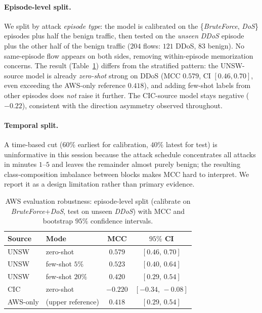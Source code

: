 \documentclass[preprint,12pt,authoryear]{elsarticle}
\begin{document}
\paragraph{Episode-level split.} We split by attack \emph{episode type}: the model
is calibrated on the \{\emph{BruteForce}, \emph{DoS}\} episodes plus half the benign
traffic, then tested on the \emph{unseen} \emph{DDoS} episode plus the other half of
the benign traffic ($204$ flows: $121$ DDoS, $83$ benign). No same-episode flow
appears on both sides, removing within-episode memorization concerns. The result
(Table~\ref{tab:rt-robust}) differs from the stratified pattern: the UNSW-source
model is already \emph{zero-shot} strong on DDoS (MCC $0.579$, CI $[0.46,0.70]$,
even exceeding the AWS-only reference $0.418$), and adding few-shot labels from other
episodes does \emph{not} raise it further. The CIC-source model stays negative
($-0.22$), consistent with the direction asymmetry observed throughout.

\paragraph{Temporal split.} A time-based cut ($60\%$ earliest for calibration,
$40\%$ latest for test) is uninformative in this session because the attack schedule
concentrates all attacks in minutes $1$--$5$ and leaves the remainder almost purely
benign; the resulting class-composition imbalance between blocks makes MCC hard to
interpret. We report it as a design limitation rather than primary evidence.

\begin{table}[h]
\centering
\caption{AWS evaluation robustness: episode-level split (calibrate on
\emph{BruteForce}$+$\emph{DoS}, test on unseen \emph{DDoS}) with MCC and bootstrap
$95\%$ confidence intervals.}
\label{tab:rt-robust}
\small
\begin{tabular}{llcc}
\toprule
Source & Mode & MCC & $95\%$ CI \\
\midrule
UNSW & zero-shot        & $0.579$  & $[0.46,\,0.70]$ \\
UNSW & few-shot $5\%$   & $0.523$  & $[0.40,\,0.64]$ \\
UNSW & few-shot $20\%$  & $0.420$  & $[0.29,\,0.54]$ \\
CIC  & zero-shot        & $-0.220$ & $[-0.34,\,-0.08]$ \\
\midrule
AWS-only & (upper reference) & $0.418$ & $[0.29,\,0.54]$ \\
\bottomrule
\end{tabular}
\end{table}
\end{document}
